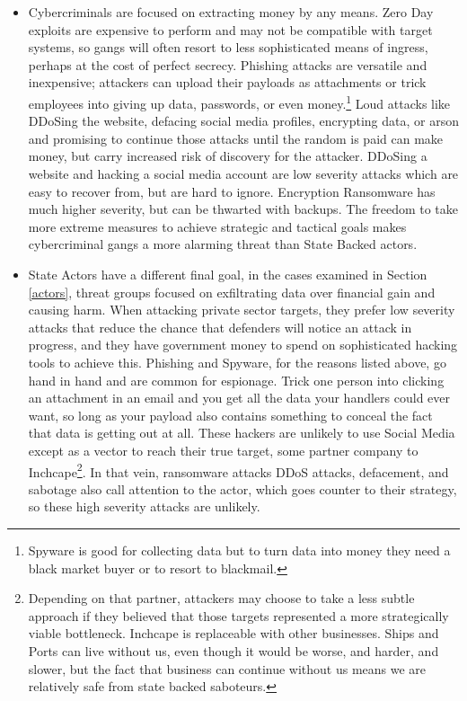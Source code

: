 \documentclass[12pt]{article}
\begin{document}
\begin{itemize}
    \item Cybercriminals are focused on extracting money by any means. Zero Day exploits are expensive to perform and may not be compatible with target systems, so gangs will often resort to less sophisticated means of ingress, perhaps at the cost of perfect secrecy. Phishing attacks are versatile and inexpensive; attackers can upload their payloads as attachments or trick employees into giving up data, passwords, or even money.\footnote{Spyware is good for collecting data but to turn data into money they need a black market buyer or to resort to blackmail.} Loud attacks like DDoSing the website, defacing social media profiles, encrypting data, or arson and promising to continue those attacks until the random is paid can make money, but carry increased risk of discovery for the attacker. DDoSing a website and hacking a social media account are low severity attacks which are easy to recover from, but are hard to ignore. Encryption Ransomware has much higher severity, but can be thwarted with backups. The freedom to take more extreme measures to achieve strategic and tactical goals makes cybercriminal gangs a more alarming threat than State Backed actors.
    \item State Actors have a different final goal, in the cases examined in Section \ref{actors}, threat groups focused on exfiltrating data over financial gain and causing harm. When attacking private sector targets, they prefer low severity attacks that reduce the chance that defenders will notice an attack in progress, and they have government money to spend on sophisticated hacking tools to achieve this. Phishing and Spyware, for the reasons listed above, go hand in hand and are common for espionage. Trick one person into clicking an attachment in an email and you get all the data your handlers could ever want, so long as your payload also contains something to conceal the fact that data is getting out at all. These hackers are unlikely to use Social Media except as a vector to reach their true target, some partner company to Inchcape\footnote{Depending on that partner, attackers may choose to take a less subtle approach if they believed that those targets represented a more strategically viable bottleneck. Inchcape is replaceable with other businesses. Ships and Ports can live without us, even though it would be worse, and harder, and slower, but the fact that business can continue without us means we are relatively safe from state backed saboteurs.}. In that vein, ransomware attacks DDoS attacks, defacement, and sabotage also call attention to the actor, which goes counter to their strategy, so these high severity attacks are unlikely. 
\end{itemize}
\end{document}
